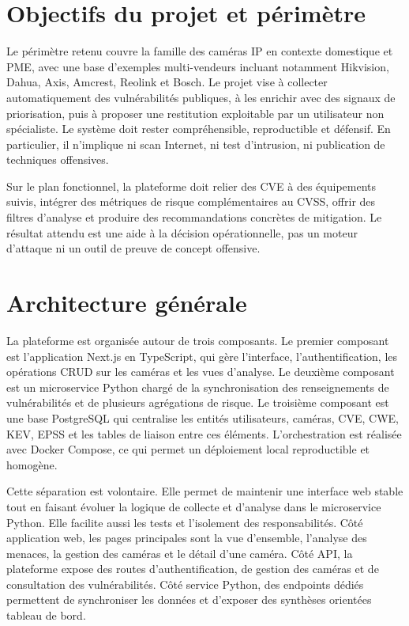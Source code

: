 \documentclass[12pt]{article}
\begin{document}
\section{Objectifs du projet et périmètre}
Le périmètre retenu couvre la famille des caméras IP en contexte domestique et PME, avec une base d'exemples multi-vendeurs incluant notamment Hikvision, Dahua, Axis, Amcrest, Reolink et Bosch. Le projet vise à collecter automatiquement des vulnérabilités publiques, à les enrichir avec des signaux de priorisation, puis à proposer une restitution exploitable par un utilisateur non spécialiste. Le système doit rester compréhensible, reproductible et défensif. En particulier, il n'implique ni scan Internet, ni test d'intrusion, ni publication de techniques offensives.

Sur le plan fonctionnel, la plateforme doit relier des CVE à des équipements suivis, intégrer des métriques de risque complémentaires au CVSS, offrir des filtres d'analyse et produire des recommandations concrètes de mitigation. Le résultat attendu est une aide à la décision opérationnelle, pas un moteur d'attaque ni un outil de preuve de concept offensive.

\section{Architecture générale}
La plateforme est organisée autour de trois composants. Le premier composant est l'application Next.js en TypeScript, qui gère l'interface, l'authentification, les opérations CRUD sur les caméras et les vues d'analyse. Le deuxième composant est un microservice Python chargé de la synchronisation des renseignements de vulnérabilités et de plusieurs agrégations de risque. Le troisième composant est une base PostgreSQL qui centralise les entités utilisateurs, caméras, CVE, CWE, KEV, EPSS et les tables de liaison entre ces éléments. L'orchestration est réalisée avec Docker Compose, ce qui permet un déploiement local reproductible et homogène.

Cette séparation est volontaire. Elle permet de maintenir une interface web stable tout en faisant évoluer la logique de collecte et d'analyse dans le microservice Python. Elle facilite aussi les tests et l'isolement des responsabilités. Côté application web, les pages principales sont la vue d'ensemble, l'analyse des menaces, la gestion des caméras et le détail d'une caméra. Côté API, la plateforme expose des routes d'authentification, de gestion des caméras et de consultation des vulnérabilités. Côté service Python, des endpoints dédiés permettent de synchroniser les données et d'exposer des synthèses orientées tableau de bord.
\end{document}
